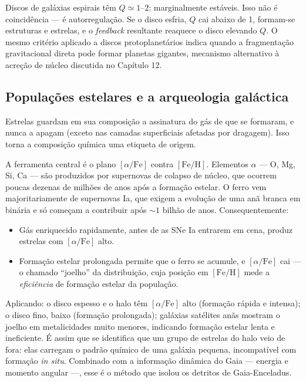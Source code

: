 \documentclass[11pt,a4paper]{article}
\begin{document}
Discos de galáxias espirais têm $Q\simeq1$--$2$: marginalmente estáveis. Isso não é coincidência --- é autorregulação. Se o disco esfria, $Q$ cai abaixo de 1, formam-se estruturas e estrelas, e o \textit{feedback} resultante reaquece o disco elevando $Q$. O mesmo critério aplicado a discos protoplanetários indica quando a fragmentação gravitacional direta pode formar planetas gigantes, mecanismo alternativo à acreção de núcleo discutida no Capítulo 12.

\subsection*{Populações estelares e a arqueologia galáctica}

Estrelas guardam em sua composição a assinatura do gás de que se formaram, e nunca a apagam (exceto nas camadas superficiais afetadas por dragagem). Isso torna a composição química uma etiqueta de origem.

A ferramenta central é o plano $[\alpha/\mathrm{Fe}]$ contra $[\mathrm{Fe/H}]$. Elementos $\alpha$ --- O, Mg, Si, Ca --- são produzidos por supernovas de colapso de núcleo, que ocorrem poucas dezenas de milhões de anos após a formação estelar. O ferro vem majoritariamente de supernovas Ia, que exigem a evolução de uma anã branca em binária e só começam a contribuir após $\sim1$ bilhão de anos. Consequentemente:

\begin{itemize}
\item Gás enriquecido rapidamente, antes de as SNe Ia entrarem em cena, produz estrelas com $[\alpha/\mathrm{Fe}]$ alto.
\item Formação estelar prolongada permite que o ferro se acumule, e $[\alpha/\mathrm{Fe}]$ cai --- o chamado ``joelho'' da distribuição, cuja posição em $[\mathrm{Fe/H}]$ mede a \emph{eficiência} de formação estelar da população.
\end{itemize}

Aplicando: o disco espesso e o halo têm $[\alpha/\mathrm{Fe}]$ alto (formação rápida e intensa); o disco fino, baixo (formação prolongada); galáxias satélites anãs mostram o joelho em metalicidades muito menores, indicando formação estelar lenta e ineficiente. É assim que se identifica que um grupo de estrelas do halo veio de fora: elas carregam o padrão químico de uma galáxia pequena, incompatível com formação \textit{in situ}. Combinado com a informação dinâmica do Gaia --- energia e momento angular ---, esse é o método que isolou os detritos de Gaia-Enceladus.
\end{document}
